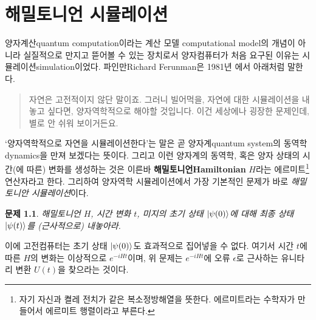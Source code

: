 \documentclass[a4paper,atbegshi,chapter]{oblivoir}
\newtheorem{prob}{문제}[chapter]
\begin{document}
\chapter{해밀토니언 시뮬레이션}
양자계산{\footnotesize quantum computation}이라는 계산 모델{\footnotesize
computational model}의 개념이 아니라 실질적으로 만지고 뜯어볼 수 있는 장치로서
양자컴퓨터가 처음 요구된 이유는 시뮬레이션{\footnotesize simulation}이었다. 
파인만{\footnotesize Richard Ferunman}은 1981년 에서 아래처럼 말한다.
\begin{quote}
  자연은 고전적이지 않단 말이죠. 그러니 빌어먹을, 자연에 대한 시뮬레이션을
  내놓고 싶다면, 양자역학적으로 해야할 것입니다. 이건 세상에나 굉장한 문제인데,
  별로 안 쉬워 보이거든요.
\end{quote}
`양자역학적으로 자연을 시뮬레이션한다'는 말은 곧 양자계{\footnotesize quantum
system}의 동역학{\footnotesize dynamics}을 만져 보겠다는 뜻이다. 그리고 이런
양자계의 동역학, 혹은 양자 상태의 시간(에 따른) 변화를 생성하는 것은 
이른바 \textbf{해밀토니언\footnotesize Hamiltonian} $H$라는 
에르미트\footnote{자기 자신과 켤레 전치가 같은 복소정방해열을 뜻한다. 에르미트라는
수학자가 만들어서 에르미트 행렬이라고 부른다.} 연산자라고 한다. 그리하여
양자역학 시뮬레이션에서 가장 기본적인 문제가 바로 \emph{해밀토니안 
시뮬레이션}이다.
\begin{prob}해밀토니언 $H$, 시간 변화 $t$, 미지의 초기 상태 $\ket{\psi(0)}$에
  대해 최종 상태 $\ket{\psi(t)}$를 (근사적으로) 내놓아라.
\end{prob}
이에 고전컴퓨터는 초기 상태 $\ket{\psi(0)}$도 효과적으로 집어넣을 수 없다. 여기서
시간 $t$에 따른 $H$의 변화는 이상적으로 $e^{-iHt}$이며, 위 문제는 $e^{-iHt}$에
오류 $\epsilon$로 근사하는 유니타리 변환 $U(t)$을 찾으라는 것이다.
\end{document}
